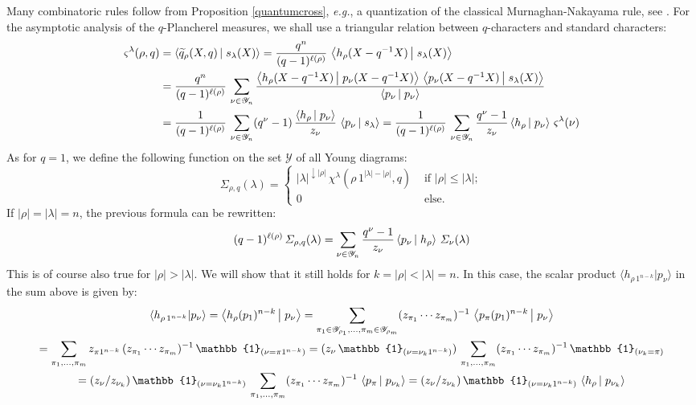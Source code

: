 \documentclass[10pt]{amsart}
\theoremstyle{remark}
\newcommand{\young}{\mathscr{Y}}
\newcommand{\scal}[2]{\left\langle #1\vphantom{#2}\,\right |\left.#2 \vphantom{#1}\right\rangle}
\begin{document}
Many combinatoric rules follow from Proposition \ref{quantumcross}, \emph{e.g.}, a quantization of the classical Murnaghan-Nakayama rule, see \cite[\S2]{RR97}. For the asymptotic analysis of the $q$-Plancherel measures, we shall use a triangular relation between $q$-characters and standard characters:
\begin{align*}
\varsigma^{\lambda}(\rho,q)&=\scal{\widetilde{q}_\rho(X,q)}{s_\lambda(X)} =\frac{q^n}{(q-1)^{\ell(\rho)}}\,\scal{h_\rho(X-q^{-1}X)}{s_\lambda(X)}\\
&=\frac{q^n}{(q-1)^{\ell(\rho)}}\,\sum_{\nu\in \young_n} \frac{\scal{h_\rho(X-q^{-1}X)}{p_\nu(X-q^{-1}X)}\,\scal{p_\nu(X-q^{-1}X)}{s_\lambda(X)}}{\scal{p_\nu}{p_\nu}}\\
&=\frac{1}{(q-1)^{\ell(\rho)}}\,\sum_{\nu \in \young_n}(q^\nu-1)\,\frac{\scal{h_\rho}{p_\nu}}{z_\nu}\,\scal{p_\nu}{s_\lambda}=\frac{1}{(q-1)^{\ell(\rho)}}\,\sum_{\nu \in \young_n}\frac{q^\nu-1}{z_\nu}\scal{h_\rho}{p_\nu}\,\varsigma^\lambda(\nu)
\end{align*}
As for $q=1$, we define the following function on the set $\young$ of all Young diagrams:
$$\varSigma_{\rho,q}(\lambda)= \left\{\begin{array}{ll} |\lambda|^{\downarrow |\rho|}\,\chi^\lambda(\rho\,1^{|\lambda|-|\rho|},q) & \text{ if }|\rho| \leq |\lambda| ; \\ 0 & \text{ else.} \end{array}\right.$$
If $|\rho|=|\lambda|=n$, the previous formula can be rewritten:
\begin{equation}\label{eq:sigmaq_fct_sigma}
(q-1)^{\ell(\rho)}\,\varSigma_{\rho,q}(\lambda)=\sum_{\nu \in \young_n} \frac{q^\nu-1}{z_\nu}\scal{p_\nu}{h_\rho}\,\varSigma_\nu(\lambda)
\end{equation}
This is of course also true for $|\rho| > |\lambda|$. We will show that it still holds for $k=|\rho| < |\lambda|=n$. In this case, the scalar product $\langle h_{\rho\,1^{n-k}}| p_\nu \rangle$ in the sum above is given by:
\begin{multline*}
\langle h_{\rho\,1^{n-k}}| p_\nu \rangle=\scal{h_\rho(p_1)^{n-k}}{p_\nu}=\sum_{\pi_1\in \young_{\rho_1},\ldots,\pi_m\in \young_{\rho_m}} (z_{\pi_1}\cdots z_{\pi_m})^{-1} \,\scal{p_\pi(p_1)^{n-k}}{p_\nu} \\
=\sum_{\pi_1,\ldots,\pi_m} z_{\pi1^{n-k}} \,(z_{\pi_1}\cdots z_{\pi_m})^{-1}\,\mathbb{1}_{(\nu=\pi1^{n-k})}
=(z_\nu\,\mathbb{1}_{(\nu=\nu_k1^{n-k})})\,\sum_{\pi_1,\ldots,\pi_m} (z_{\pi_1}\cdots z_{\pi_m})^{-1}\,\mathbb{1}_{(\nu_k=\pi)}\\
=(z_\nu /z_{\nu_k})\,\mathbb{1}_{(\nu=\nu_k1^{n-k})}\,\sum_{\pi_1,\ldots,\pi_m} (z_{\pi_1}\cdots z_{\pi_m})^{-1}\,\scal{p_\pi}{p_{\nu_k}}=(z_\nu /z_{\nu_k})\,\mathbb{1}_{(\nu=\nu_k1^{n-k})}\,\scal{h_\rho}{p_{\nu_k}}
\end{multline*}
\end{document}
